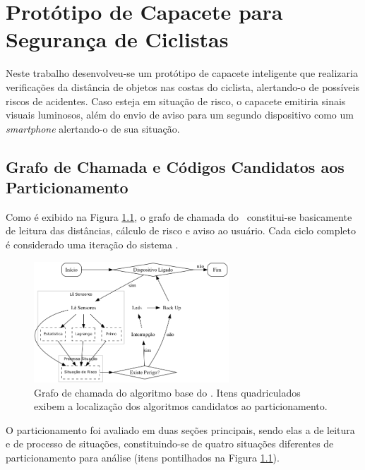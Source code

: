 \chapter{Protótipo de Capacete para Segurança de Ciclistas} \label{chap:prototipo}

    Neste trabalho desenvolveu-se um protótipo de capacete inteligente que realizaria verificações da distância de objetos nas costas do ciclista, alertando-o de possíveis riscos de acidentes.
    Caso esteja em situação de risco, o capacete emitiria sinais visuais luminosos, além do envio de aviso para um segundo dispositivo como um \textit{smartphone} alertando-o de sua situação.
    

    \section{Grafo de Chamada e Códigos Candidatos aos Particionamento}
        
        Como é exibido na Figura \ref{fig:gc}, o grafo de chamada do \wearable\ constitui-se basicamente de leitura das distâncias, cálculo de risco e aviso ao usuário.
        Cada ciclo completo é considerado uma iteração do sistema \wearable.
        
        \begin{figure}[h] \centering
            \vspace{-0.5em}
            \includegraphics[width=0.65\textwidth]{img/capacete.png}
            \caption{Grafo de chamada do algoritmo base do \wearable. Itens quadriculados exibem a localização dos algoritmos candidatos ao particionamento.}
            \label{fig:gc}
        \end{figure}
        
        O particionamento foi avaliado em duas seções principais, sendo elas a de leitura e de processo de situações, constituindo-se de quatro situações diferentes de particionamento para análise (itens pontilhados na Figura \ref{fig:gc}).
        
